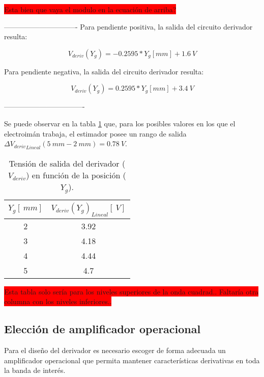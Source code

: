 \colorbox{red}{Esta bien que vaya el modulo en la ecuación de arriba?}

-------------------------------
Para pendiente positiva, la salida del circuito derivador resulta:

\begin{equation} \label{eq_Vyf-lineal}
	V_{deriv}(Y_g) = -0.2595*Y_g[mm] + 1.6\:V
\end{equation}


Para pendiente negativa, la salida del circuito derivador resulta:

\begin{equation} \label{eq_Vyf-lineal}
	V_{deriv}(Y_g) = 0.2595*Y_g[mm] + 3.4\:V
\end{equation}

----------------------------------

Se puede observar en la tabla \ref{tab_Vyf_vs_y} que, para los posibles valores en los que el electroimán trabaja, el estimador posee un rango de salida ${\mathit{\Delta}{V_{deriv}}_{Lineal}}(5\:mm-2\:mm)= 0.78\:V$.

\begin{table}[H]
	\begin{center}
		\begin{tabular}{| c | c |}
			\hline
			$Y_g[\:mm]$ & ${V_{deriv}(Y_g)}_{Lineal} [\:V]$\\ \hline
			2 & 3.92 \\ \hline 
			3 & 4.18 \\ \hline 
			4 & 4.44 \\ \hline 
			5 & 4.7 \\ \hline 
		\end{tabular}
		\caption{Tensión de salida del derivador ($V_{deriv}$) en función de la posición ($Y_g$).}
		\label{tab_Vyf_vs_y}
	\end{center}
\end{table}

\colorbox{red}{Esta tabla solo sería para los niveles superiores de la onda cuadrad..  Faltaría otra columna con los niveles inferiores..}

\subsection{Elección de amplificador operacional}

Para el diseño del derivador es necesario escoger de forma adecuada un amplificador operacional que permita mantener características derivativas en toda la banda de interés.

